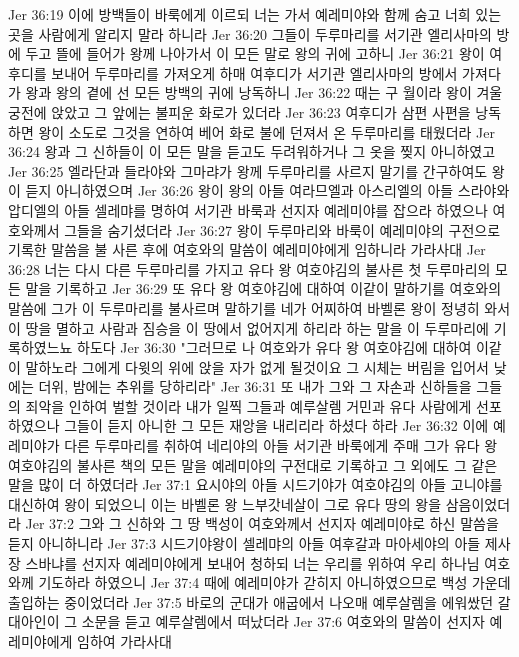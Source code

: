 Jer 36:19  이에 방백들이 바룩에게 이르되 너는 가서 예레미야와 함께 숨고 너희 있는 곳을 사람에게 알리지 말라 하니라
Jer 36:20  그들이 두루마리를 서기관 엘리사마의 방에 두고 뜰에 들어가 왕께 나아가서 이 모든 말로 왕의 귀에 고하니
Jer 36:21  왕이 여후디를 보내어 두루마리를 가져오게 하매 여후디가 서기관 엘리사마의 방에서 가져다가 왕과 왕의 곁에 선 모든 방백의 귀에 낭독하니
Jer 36:22  때는 구 월이라 왕이 겨울궁전에 앉았고 그 앞에는 불피운 화로가 있더라
Jer 36:23  여후디가 삼편 사편을 낭독하면 왕이 소도로 그것을 연하여 베어 화로 불에 던져서 온 두루마리를 태웠더라
Jer 36:24  왕과 그 신하들이 이 모든 말을 듣고도 두려워하거나 그 옷을 찢지 아니하였고
Jer 36:25  엘라단과 들라야와 그마랴가 왕께 두루마리를 사르지 말기를 간구하여도 왕이 듣지 아니하였으며
Jer 36:26  왕이 왕의 아들 여라므엘과 아스리엘의 아들 스라야와 압디엘의 아들 셀레먀를 명하여 서기관 바룩과 선지자 예레미야를 잡으라 하였으나 여호와께서 그들을 숨기셨더라
Jer 36:27  왕이 두루마리와 바룩이 예레미야의 구전으로 기록한 말씀을 불 사른 후에 여호와의 말씀이 예레미야에게 임하니라 가라사대
Jer 36:28  너는 다시 다른 두루마리를 가지고 유다 왕 여호야김의 불사른 첫 두루마리의 모든 말을 기록하고
Jer 36:29  또 유다 왕 여호야김에 대하여 이같이 말하기를 여호와의 말씀에 그가 이 두루마리를 불사르며 말하기를 네가 어찌하여 바벨론 왕이 정녕히 와서 이 땅을 멸하고 사람과 짐승을 이 땅에서 없어지게 하리라 하는 말을 이 두루마리에 기록하였느뇨 하도다
Jer 36:30  "그러므로 나 여호와가 유다 왕 여호야김에 대하여 이같이 말하노라 그에게 다윗의 위에 앉을 자가 없게 될것이요 그 시체는 버림을 입어서 낮에는 더위, 밤에는 추위를 당하리라"
Jer 36:31  또 내가 그와 그 자손과 신하들을 그들의 죄악을 인하여 벌할 것이라 내가 일찍 그들과 예루살렘 거민과 유다 사람에게 선포하였으나 그들이 듣지 아니한 그 모든 재앙을 내리리라 하셨다 하라
Jer 36:32  이에 예레미야가 다른 두루마리를 취하여 네리야의 아들 서기관 바룩에게 주매 그가 유다 왕 여호야김의 불사른 책의 모든 말을 예레미야의 구전대로 기록하고 그 외에도 그 같은 말을 많이 더 하였더라
Jer 37:1  요시야의 아들 시드기야가 여호야김의 아들 고니야를 대신하여 왕이 되었으니 이는 바벨론 왕 느부갓네살이 그로 유다 땅의 왕을 삼음이었더라
Jer 37:2  그와 그 신하와 그 땅 백성이 여호와께서 선지자 예레미야로 하신 말씀을 듣지 아니하니라
Jer 37:3  시드기야왕이 셀레먀의 아들 여후갈과 마아세야의 아들 제사장 스바냐를 선지자 예레미야에게 보내어 청하되 너는 우리를 위하여 우리 하나님 여호와께 기도하라 하였으니
Jer 37:4  때에 예레미야가 갇히지 아니하였으므로 백성 가운데 출입하는 중이었더라
Jer 37:5  바로의 군대가 애굽에서 나오매 예루살렘을 에워쌌던 갈대아인이 그 소문을 듣고 예루살렘에서 떠났더라
Jer 37:6  여호와의 말씀이 선지자 예레미야에게 임하여 가라사대
